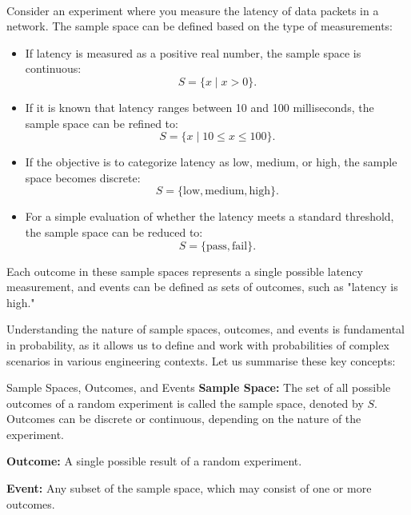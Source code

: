 \begin{example} \\
Consider an experiment where you measure the latency of data packets in a network. The sample space can be defined based on the type of measurements:
\begin{itemize}
    \item If latency is measured as a positive real number, the sample space is continuous: 
    \[
    S = \{ x \mid x > 0 \}.
    \]
    \item If it is known that latency ranges between 10 and 100 milliseconds, the sample space can be refined to:
    \[
    S = \{ x \mid 10 \leq x \leq 100 \}.
    \]
    \item If the objective is to categorize latency as low, medium, or high, the sample space becomes discrete:
    \[
    S = \{\text{low}, \text{medium}, \text{high}\}.
    \]
    \item For a simple evaluation of whether the latency meets a standard threshold, the sample space can be reduced to:
    \[
    S = \{\text{pass}, \text{fail}\}.
    \]
\end{itemize}
Each outcome in these sample spaces represents a single possible latency measurement, and events can be defined as sets of outcomes, such as "latency is high."

\end{example}

Understanding the nature of sample spaces, outcomes, and events is fundamental in probability, as it allows us to define and work with probabilities of complex scenarios in various engineering contexts. Let us summarise these key concepts:

\begin{definition}{Sample Spaces, Outcomes, and Events}
    \textbf{Sample Space:} The set of all possible outcomes of a random experiment is called the sample space, denoted by \( S \). Outcomes can be discrete or continuous, depending on the nature of the experiment.
    
    \textbf{Outcome:} A single possible result of a random experiment.
    
    \textbf{Event:} Any subset of the sample space, which may consist of one or more outcomes.
\end{definition}

